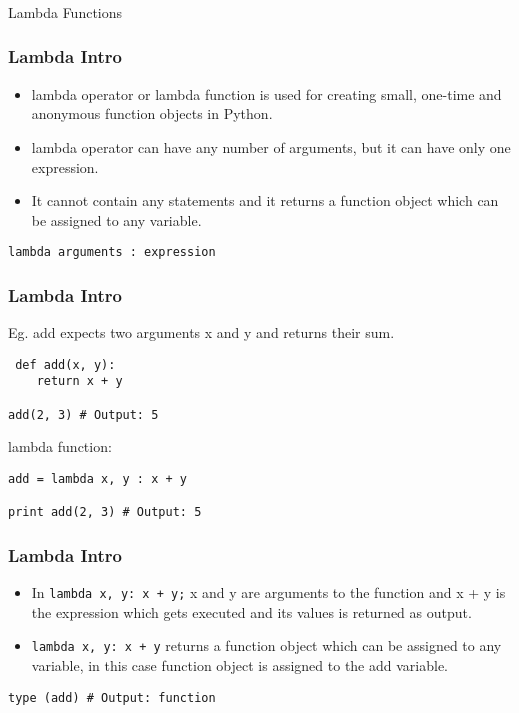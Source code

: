 \begin{frame}[fragile]\frametitle{}
\begin{center}
{\Large Lambda Functions}
\end{center}
\end{frame}

\begin{frame}[fragile]\frametitle{Lambda Intro}

    \begin{itemize}
    \item  lambda operator or lambda function is used for creating small, one-time and anonymous function objects in Python.
    \item lambda operator can have any number of arguments, but it can have only one expression. 
    \item It cannot contain any statements and it returns a function object which can be assigned to any variable.
    \end{itemize}
    \begin{lstlisting}
lambda arguments : expression
\end{lstlisting}
\end{frame}

\begin{frame}[fragile]\frametitle{Lambda Intro}
Eg. add expects two arguments x and y and returns their sum.
\begin{lstlisting}
 def add(x, y): 
    return x + y

add(2, 3) # Output: 5
\end{lstlisting}
lambda function:
\begin{lstlisting}
add = lambda x, y : x + y 
  
print add(2, 3) # Output: 5
\end{lstlisting}
\end{frame}


\begin{frame}[fragile]\frametitle{Lambda Intro}

    \begin{itemize}
    \item  In \lstinline|lambda x, y: x + y;| x and y are arguments to the function and x + y is the expression which gets executed and its values is returned as output.
\item \lstinline|lambda x, y: x + y| returns a function object which can be assigned to any variable, in this case function object is assigned to the add variable.

    \end{itemize}
    \begin{lstlisting}
type (add) # Output: function
\end{lstlisting}
\end{frame}


